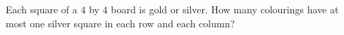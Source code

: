 Each square of a $4$ by $4$ board is gold or silver. How many colourings have at most one silver square in each row and each column?
